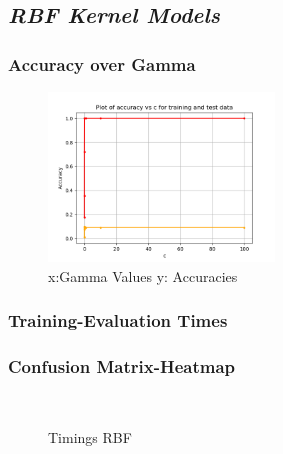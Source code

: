 \documentclass[10pt,a4paper,]{article}
\begin{document}
\subsection{\textit{RBF Kernel Models}}

\subsubsection{Accuracy over Gamma}
\begin{figure}[!htb]
    \centering
    \includegraphics[width=6cm]{img/svm_3classclassifier.png}
    \caption{x:Gamma Values y: Accuracies}
    \label{fig:my_label}
\end{figure}
\subsubsection{Training-Evaluation Times}
\subsubsection{Confusion Matrix-Heatmap}
\begin{figure}[!htb]
\centering
    \hfill
    \\
    \caption{Timings RBF}
\end{figure}
\end{document}
